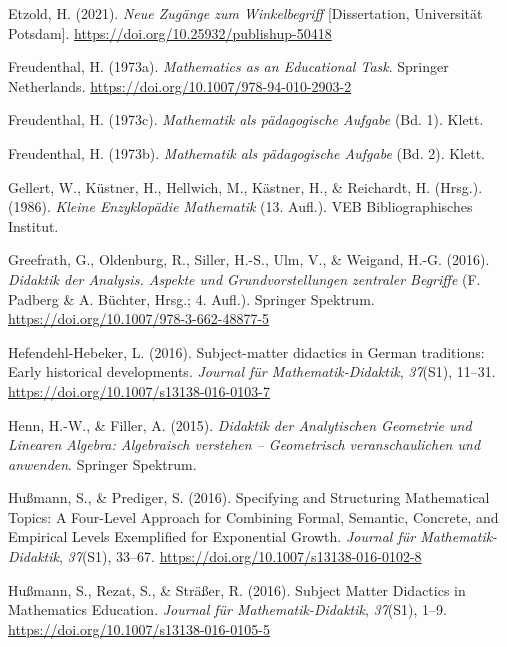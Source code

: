 \documentclass[
]{scrbook}
\newlength{\cslhangindent}
\newenvironment{CSLReferences}[2] %
 {\begin{list}{}{%
  \setlength{\itemindent}{0pt}
  \setlength{\leftmargin}{0pt}
  \setlength{\parsep}{0pt}
  \ifodd #1
   \setlength{\leftmargin}{\cslhangindent}
   \setlength{\itemindent}{-1\cslhangindent}
  \fi
  \setlength{\itemsep}{#2\baselineskip}}}
 {\end{list}}
\theoremstyle{definition}
\theoremstyle{definition}
\theoremstyle{definition}
\theoremstyle{definition}
\theoremstyle{remark}
\begin{document}
\begin{CSLReferences}{1}{0}
Etzold, H. (2021). \emph{Neue Zugänge zum Winkelbegriff} {[}Dissertation, Universität Potsdam{]}. \url{https://doi.org/10.25932/publishup-50418}

Freudenthal, H. (1973a). \emph{Mathematics as an {Educational} {Task}}. Springer Netherlands. \url{https://doi.org/10.1007/978-94-010-2903-2}

Freudenthal, H. (1973c). \emph{Mathematik als pädagogische {Aufgabe}} (Bd. 1). Klett.

Freudenthal, H. (1973b). \emph{Mathematik als pädagogische {Aufgabe}} (Bd. 2). Klett.

Gellert, W., Küstner, H., Hellwich, M., Kästner, H., \& Reichardt, H. (Hrsg.). (1986). \emph{Kleine {Enzyklopädie} {Mathematik}} (13. Aufl.). VEB Bibliographisches Institut.

Greefrath, G., Oldenburg, R., Siller, H.-S., Ulm, V., \& Weigand, H.-G. (2016). \emph{Didaktik der {Analysis}. {Aspekte} und {Grundvorstellungen} zentraler {Begriffe}} (F. Padberg \& A. Büchter, Hrsg.; 4. Aufl.). Springer Spektrum. \url{https://doi.org/10.1007/978-3-662-48877-5}

Hefendehl-Hebeker, L. (2016). Subject-matter didactics in {German} traditions: {Early} historical developments. \emph{Journal für Mathematik-Didaktik}, \emph{37}(S1), 11--31. \url{https://doi.org/10.1007/s13138-016-0103-7}

Henn, H.-W., \& Filler, A. (2015). \emph{Didaktik der {Analytischen} {Geometrie} und {Linearen} {Algebra}: {Algebraisch} verstehen -- {Geometrisch} veranschaulichen und anwenden}. Springer Spektrum.

Hußmann, S., \& Prediger, S. (2016). Specifying and Structuring Mathematical Topics: A Four-Level Approach for Combining Formal, Semantic, Concrete, and Empirical Levels Exemplified for Exponential Growth. \emph{Journal für Mathematik-Didaktik}, \emph{37}(S1), 33--67. \url{https://doi.org/10.1007/s13138-016-0102-8}

Hußmann, S., Rezat, S., \& Sträßer, R. (2016). Subject {Matter} {Didactics} in {Mathematics} {Education}. \emph{Journal für Mathematik-Didaktik}, \emph{37}(S1), 1--9. \url{https://doi.org/10.1007/s13138-016-0105-5}


\end{CSLReferences}
\end{document}
